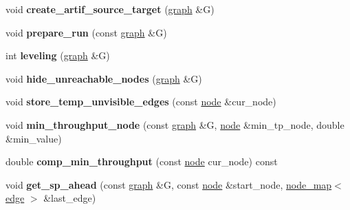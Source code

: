 \begin{DoxyCompactItemize}
\item 
\mbox{\label{classmaxflow__pp_a02438e89291eeccda0b247d20ffa11e5}} 
void {\bfseries create\+\_\+artif\+\_\+source\+\_\+target} (\mbox{\hyperlink{classgraph}{graph}} \&G)
\item 
\mbox{\label{classmaxflow__pp_a7a738741f8050df0cb0be0381aef0825}} 
void {\bfseries prepare\+\_\+run} (const \mbox{\hyperlink{classgraph}{graph}} \&G)
\item 
\mbox{\label{classmaxflow__pp_adefb2cdc0145d57efd2d93c17a180896}} 
int {\bfseries leveling} (\mbox{\hyperlink{classgraph}{graph}} \&G)
\item 
\mbox{\label{classmaxflow__pp_a93bb037fd3fc83c6558b560fc4da2340}} 
void {\bfseries hide\+\_\+unreachable\+\_\+nodes} (\mbox{\hyperlink{classgraph}{graph}} \&G)
\item 
\mbox{\label{classmaxflow__pp_abb23812a3e8bca1955b835d3c41836e1}} 
void {\bfseries store\+\_\+temp\+\_\+unvisible\+\_\+edges} (const \mbox{\hyperlink{classnode}{node}} \&cur\+\_\+node)
\item 
\mbox{\label{classmaxflow__pp_a9f820f51329f0e0ec4d8123547ae6ebd}} 
void {\bfseries min\+\_\+throughput\+\_\+node} (const \mbox{\hyperlink{classgraph}{graph}} \&G, \mbox{\hyperlink{classnode}{node}} \&min\+\_\+tp\+\_\+node, double \&min\+\_\+value)
\item 
\mbox{\label{classmaxflow__pp_ab1146e40ae2f2405e0ca6ea3ff43a6ff}} 
double {\bfseries comp\+\_\+min\+\_\+throughput} (const \mbox{\hyperlink{classnode}{node}} cur\+\_\+node) const
\item 
\mbox{\label{classmaxflow__pp_a340e4b9909a44ed7003760017c761e3b}} 
void {\bfseries get\+\_\+sp\+\_\+ahead} (const \mbox{\hyperlink{classgraph}{graph}} \&G, const \mbox{\hyperlink{classnode}{node}} \&start\+\_\+node, \mbox{\hyperlink{classnode__map}{node\+\_\+map}}$<$ \mbox{\hyperlink{classedge}{edge}} $>$ \&last\+\_\+edge)
\item 
\mbox{\label{classmaxflow__pp_a58b7af1b215766e99adcca0994ecfb7a}} 

\end{DoxyCompactItemize}
